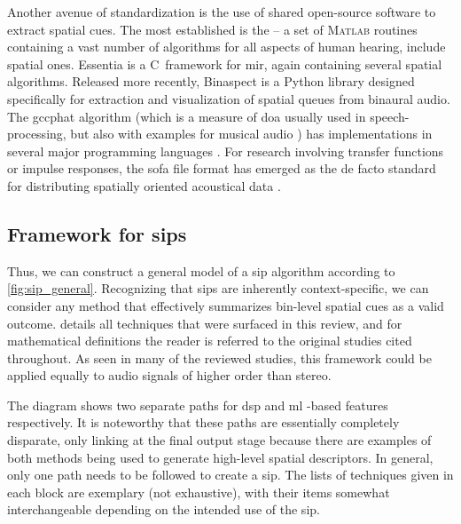 \documentclass[referee,pdflatex,sn-mathphys-num]{sn-jnl}%
\def\CC{{C\nolinebreak[4]\hspace{-.05em}\raisebox{.4ex}{\tiny\bf ++}}}
\begin{document}
Another avenue of standardization is the use of shared open-source software to extract spatial cues. The most established is the  \cite{majdakAMT1xToolbox2022} -- a set of \textsc{Matlab} routines containing a vast number of algorithms for all aspects of human hearing, include spatial ones. Essentia \cite{bogdanovESSENTIAOpensourceLibrary2013} is a \CC~framework for \gls{mir}, again containing several spatial algorithms. Released more recently, Binaspect \cite{barryBinaspectPythonLibrary2025} is a Python library designed specifically for extraction and visualization of spatial queues from binaural audio. The \gls{gccphat} algorithm (which is a measure of \gls{doa} usually used in speech-processing, but also with examples for musical audio \cite{munoz-montoroMultichannelBlindMusic2022,antoniukBlindEstimationEnsemble2023,namballaMusicSourceSeparation2025}) has implementations in several major programming languages \cite{pearlmanZeroGCCPHAT2025,xiongGcc_phatpy2017,wootersMinidspc2013,GccphatGeneralizedCrosscorrelation}. For research involving transfer functions or impulse responses, the \gls{sofa} file format has emerged as the de facto standard for distributing spatially oriented acoustical data \cite{aes69-2020-SOFA}.


\subsection{Framework for \glspl{sip}}
\label{sec:framework_for_sips}

Thus, we can construct a general model of a \gls{sip} algorithm according to \cref{fig:sip_general}. Recognizing that \glspl{sip} are inherently context-specific, we can consider any method that effectively summarizes bin-level spatial cues as a valid outcome.  details all techniques that were surfaced in this review, and for mathematical definitions the reader is referred to the original studies cited throughout. As seen in many of the reviewed studies, this framework could be applied equally to audio signals of higher order than stereo.

The diagram shows two separate paths for \gls{dsp} and \gls{ml} -based features respectively. It is noteworthy that these paths are essentially completely disparate, only linking at the final output stage because there are examples of both methods being used to generate high-level spatial descriptors. In general, only one path needs to be followed to create a \gls{sip}. The lists of techniques given in each block are exemplary (not exhaustive), with their items somewhat interchangeable depending on the intended use of the \gls{sip}.
\end{document}
